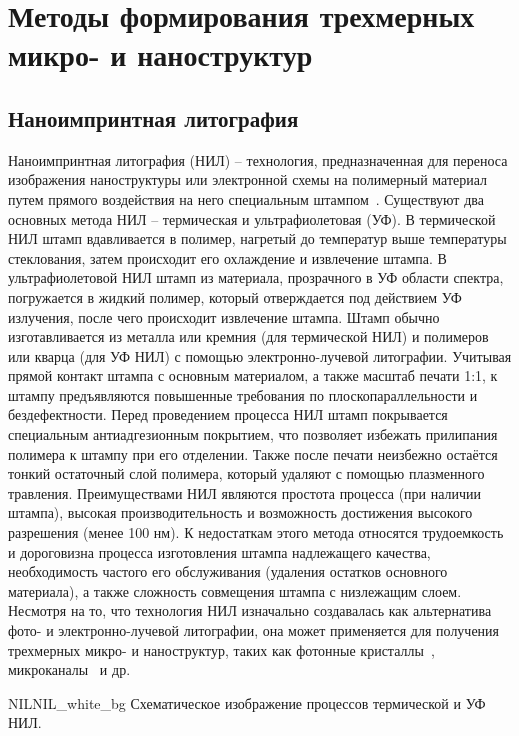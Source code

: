 \section{Методы формирования трехмерных микро- и наноструктур}

\subsection{Наноимпринтная литография}
Наноимпринтная литография (НИЛ) -- технология, предназначенная для переноса изображения наноструктуры или электронной схемы на полимерный материал путем прямого воздействия на него специальным штампом~\cite{NIL_1, NIL_2}. Существуют два основных метода НИЛ -- термическая и ультрафиолетовая (УФ). В термической НИЛ штамп вдавливается в полимер, нагретый до температур выше температуры стеклования, затем происходит его охлаждение и извлечение штампа. В ультрафиолетовой НИЛ штамп из материала, прозрачного в УФ области спектра, погружается в жидкий полимер, который отверждается под действием УФ излучения, после чего происходит извлечение штампа. Штамп обычно изготавливается из металла или кремния (для термической НИЛ) и полимеров или кварца (для УФ НИЛ) с помощью электронно-лучевой литографии. Учитывая прямой контакт штампа с основным материалом, а также масштаб печати 1:1, к штампу предъявляются повышенные требования по плоскопараллельности и бездефектности.  Перед проведением процесса НИЛ штамп покрывается специальным антиадгезионным покрытием, что позволяет избежать прилипания полимера к штампу при его отделении. Также после печати неизбежно остаётся тонкий остаточный слой полимера, который удаляют с помощью плазменного травления. Преимуществами НИЛ являются простота процесса (при наличии штампа), высокая производительность и возможность достижения высокого разрешения (менее 100 нм). К недостаткам этого метода относятся трудоемкость и дороговизна процесса изготовления штампа надлежащего качества, необходимость частого его обслуживания (удаления остатков основного материала), а также сложность совмещения штампа с низлежащим слоем. Несмотря на то, что технология НИЛ изначально создавалась как альтернатива фото- и электронно-лучевой литографии, она может применяется для получения трехмерных микро- и наноструктур, таких как фотонные кристаллы~\cite{NIL_nanophotonics}, микроканалы~\cite{NIL_microfluidics} и др.~\cite{NIL_3D_1, NIL_3D_2}

\begin{fig}{NIL}{NIL_white_bg}
	Схематическое изображение процессов термической и УФ НИЛ.
\end{fig}

